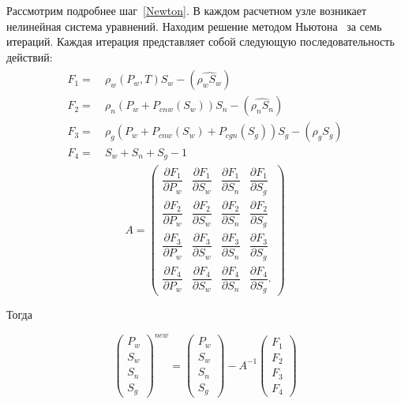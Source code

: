 Рассмотрим подробнее шаг~\ref{Newton}. В каждом расчетном узле возникает 
нелинейная система уравнений.
Находим решение методом Ньютона~\cite{Kalitkin} за семь
итераций. Каждая итерация 
представляет собой следующую последовательность действий:
\begin{eqnarray*}
  \begin{aligned}
    F_1=\ &\rho_w(P_w, T) S_w - (\widehat{\rho_w S_w}) \\
    F_2=\ &\rho_n(P_w+P_{cnw}(S_w)) S_n - (\widehat{\rho_n S_n}) \\
    F_3=\ &\rho_g(P_w+P_{cnw}(S_w)+P_{cgn}(S_g)) S_g - (\widehat{\rho_g S_g}) \\
    F_4=\ &S_w+S_n+S_g - 1
  \end{aligned}
\end{eqnarray*}
\begin{equation}
A=
\begin{pmatrix}
\dfrac{\partial{F_1}}{\partial{P_w}} & \dfrac{\partial{F_1}}{\partial{S_w}} & \dfrac{\partial{F_1}}{\partial{S_n}} & \dfrac{\partial{F_1}}{\partial{S_g}} \\[3mm]
\dfrac{\partial{F_2}}{\partial{P_w}} & \dfrac{\partial{F_2}}{\partial{S_w}} & \dfrac{\partial{F_2}}{\partial{S_n}} & \dfrac{\partial{F_2}}{\partial{S_g}} \\[3mm]
\dfrac{\partial{F_3}}{\partial{P_w}} & \dfrac{\partial{F_3}}{\partial{S_w}} & \dfrac{\partial{F_3}}{\partial{S_n}} & \dfrac{\partial{F_3}}{\partial{S_g}} \\[3mm]
\dfrac{\partial{F_4}}{\partial{P_w}} & \dfrac{\partial{F_4}}{\partial{S_w}} & \dfrac{\partial{F_4}}{\partial{S_n}} & \dfrac{\partial{F_4}}{\partial{S_g}}.
\end{pmatrix}
\end{equation}

Тогда

\begin{equation}
\begin{pmatrix}
P_w\\
S_w\\
S_n\\
S_g
\end{pmatrix}^{new}
=
\begin{pmatrix}
P_w\\
S_w\\
S_n\\
S_g
\end{pmatrix}
-A^{-1}
\begin{pmatrix}
F_1\\
F_2\\
F_3\\
F_4
\end{pmatrix}
\end{equation}\\

